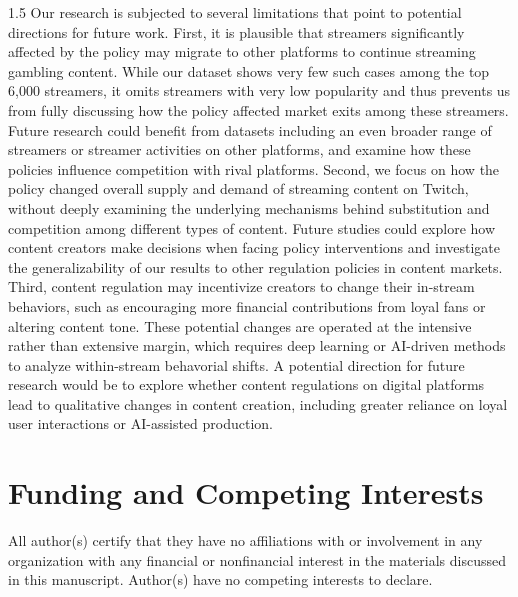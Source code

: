 \documentclass[a4paper,12pt]{article}
\begin{document}
\begin{spacing}{1.5}
Our research is subjected to several limitations that point to potential directions for future work. First, it is plausible that streamers significantly affected by the policy may migrate to other platforms to continue streaming gambling content. While our dataset shows very few such cases among the top 6,000 streamers, it omits streamers with very low popularity and thus prevents us from fully discussing how the policy affected market exits among these streamers. Future research could benefit from datasets including an even broader range of streamers or streamer activities on other platforms, and examine how these policies influence competition with rival platforms. Second, we focus on how the policy changed overall supply and demand of streaming content on Twitch, without deeply examining the underlying mechanisms behind substitution and competition among different types of content. Future studies could explore how content creators make decisions when facing policy interventions and investigate the generalizability of our results to other regulation policies in content markets. Third, content regulation may incentivize creators to change their in-stream behaviors, such as encouraging more financial contributions from loyal fans or altering content tone. These potential changes are operated at the intensive rather than extensive margin, which requires deep learning or AI-driven methods to analyze within-stream behavorial shifts. A potential direction for future research would be to explore whether content regulations on digital platforms lead to qualitative changes in content creation, including greater reliance on loyal user interactions or AI-assisted production.


\section*{Funding and Competing Interests}\label{funding-competing-interests}
All author(s) certify that they have no affiliations with or involvement in any organization with any financial or nonfinancial interest in the materials discussed in this manuscript. Author(s) have no competing interests to declare.




\end{spacing}

\newpage

% 

{\singlespacing


}
\end{document}
